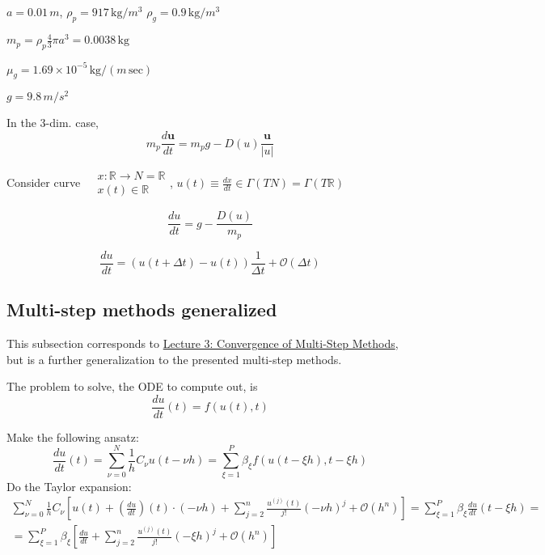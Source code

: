\documentclass[10pt]{amsart}
\begin{document}
\begin{multicols*}{2}
$a = 0.01 \, m$, $\rho_p = 917 \, \text{kg}/m^3$ \qquad $\rho_g = 0.9 \, \text{kg}/m^3$

$m_p = \rho_p \frac{4}{3} \pi a^3 = 0.0038 \, \text{kg}$

$\mu_g = 1.69 \times 10^{-5} \, \text{kg}/(m \, \text{sec})$

$g=9.8 \, m/s^2$

In the 3-dim. case,
\[
m_p \frac{d\mathbf{u}}{dt} = m_p g - D(u) \frac{\mathbf{u}}{ |u| }
\]

Consider curve $\begin{aligned} & x: \mathbb{R} \to N = \mathbb{R} \\
  & x(t) \in \mathbb{R} \end{aligned}$,  $u(t) \equiv \frac{dx}{dt} \in \Gamma(TN) = \Gamma(T\mathbb{R})$

\[
\frac{du}{dt} = g - \frac{D(u)}{m_p}
\]

\[
\frac{du}{dt} = (u(t+\Delta t) - u(t)) \frac{1}{\Delta t} + \mathcal{O}(\Delta t)
\]



\subsection{Multi-step methods generalized}

This subsection corresponds to \href{http://ocw.mit.edu/courses/aeronautics-and-astronautics/16-901-computational-methods-in-aerospace-engineering-spring-2005/lecture-notes/lect3.pdf}{Lecture 3: Convergence of Multi-Step Methods}, but is a further generalization to the presented multi-step methods.

The problem to solve, the ODE to compute out, is
\begin{equation}
\frac{du}{dt}(t) = f(u(t),t)
\end{equation}

Make the following ansatz:
\begin{equation}
  \frac{du}{dt}(t) = \sum_{\nu = 0 }^N \frac{1}{h} C_{\nu} u(t-\nu h) = \sum_{\xi = 1}^P \beta_{\xi} f(u(t-\xi h) , t-\xi h)
\end{equation}
Do the Taylor expansion:  
\[
\begin{gathered}
  \sum_{\nu =0}^N \frac{1}{h} C_{\nu} \left[ u(t) + \left( \frac{du}{dt} \right)(t) \cdot (-\nu h) + \sum_{j=2}^n \frac{u^{(j)}(t) }{j!} (-\nu h)^j + \mathcal{O}(h^n) \right] = \sum_{\xi = 1}^P \beta_{\xi} \frac{du}{dt}(t-\xi h) = \\
  = \sum_{\xi =1}^P \beta_{\xi} \left[ \frac{du}{dt} + \sum_{j=2}^n \frac{u^{(j)}(t) }{j!} (-\xi h)^j + \mathcal{O}(h^n) \right]
  \end{gathered}
\]



\end{multicols*}
\end{document}
